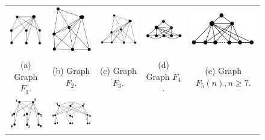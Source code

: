 \documentclass{dmgt}
\begin{document}
\begin{landscape}
 \begin{figure}[htb]	
 
   \centering
  \begin{tabular}{ccccc}
    \includegraphics[width=2.5cm]{f1.png} 
    & 
    \includegraphics[width=2.3cm]{f2.png} 
    & 
    \includegraphics[width=3cm]{f3.png} 
    & 
    \includegraphics[width=3cm]{f4.png} 
    & 
    \includegraphics[width=3cm]{f5.png} 
    \\
    \footnotesize 
    (a)  \footnotesize Graph $F_1$. 
    & 
    \footnotesize (b) Graph $F_2$.
    & 
    \footnotesize (c) Graph $F_3$.
    & 
    \footnotesize (d) Graph $F_4$.
    & 
    \footnotesize (e) Graph $F_5(n),n\geq7$.
    \\%
        \includegraphics[width=2.5cm]{f6.png} 
    & 
    \includegraphics[width=3.5cm]{f7.png} 

\end{tabular}
\end{figure}
\end{landscape}
\end{document}
